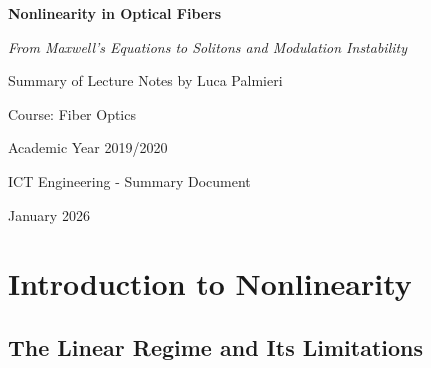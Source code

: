 \documentclass[a4paper, 11pt]{article}
\begin{document}
\begin{titlepage}
    \centering
    \vspace*{2cm}
    
    {\Huge\bfseries Nonlinearity in Optical Fibers\\[0.5cm]}
    {\Large\textit{From Maxwell's Equations to Solitons and Modulation Instability}\par}
    
    \vspace{2cm}
    
    {\large Summary of Lecture Notes by Luca Palmieri\par}
    {\large Course: Fiber Optics\par}
    {\large Academic Year 2019/2020\par}
    
    \vspace{3cm}
    
    \begin{abstract}
    This document provides a comprehensive analysis of nonlinear effects in optical fibers, starting from the transition from linear to nonlinear Maxwell equations through the mechanical oscillator model. The document derives the Nonlinear Schrödinger Equation (NLSE) from Helmholtz equation using the slowly varying envelope approximation, and explores in detail the main nonlinear phenomena: Self-Phase Modulation (SPM), Cross-Phase Modulation (XPM), Solitons, and Modulation Instability (MI). Each mathematical formula is accompanied by its physical interpretation and real-world significance.
    \end{abstract}
    
    \vfill
    
    {\large ICT Engineering - Summary Document\par}
    {\large January 2026\par}
\end{titlepage}

\tableofcontents
\newpage

\section{Introduction to Nonlinearity}

\subsection{The Linear Regime and Its Limitations}
\end{document}

